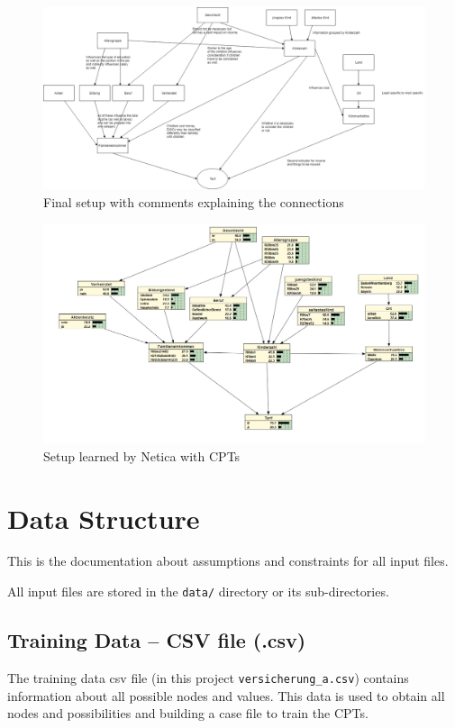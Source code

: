 \documentclass[12pt]{scrartcl}
\begin{document}
\begin{figure}[H]
    \centering
    \includegraphics[width=.9\textwidth]{img/connectionsv2.png}
    \caption{Final setup with comments explaining the connections}
    \label{fig:final_setup}
\end{figure}

\begin{figure}[H]
    \centering
    \includegraphics[width=.9\textwidth]{img/currentConnectionSetupWithLearnCPTs.png}
    \caption{Setup learned by Netica with CPTs}
    \label{fig:netica_final}
\end{figure}


\section{Data Structure}
\label{sec:data_doc}
This is the documentation about assumptions and constraints for all input files.

All input files are stored in the \texttt{data/} directory or its sub-directories.

\subsection{Training Data -- CSV file (.csv)}
The training data csv file (in this project \texttt{versicherung_a.csv}) contains information about all possible nodes and values.
This data is used to obtain all nodes and possibilities and building a case file to train the CPTs.
\end{document}
